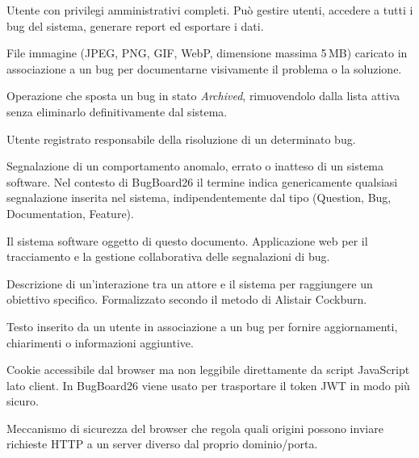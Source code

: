 ﻿\documentclass[a4paper,11pt]{article}
\begin{document}
\begin{description}[style=nextline,leftmargin=3.5cm,labelwidth=3.3cm]

\item[\textbf{Admin}] Utente con privilegi amministrativi completi. Pu\`o gestire utenti, accedere a tutti i bug del sistema, generare report ed esportare i dati.

\item[\textbf{Allegato}] File immagine (JPEG, PNG, GIF, WebP, dimensione massima 5\,MB) caricato in associazione a un bug per documentarne visivamente il problema o la soluzione.

\item[\textbf{Archiviazione}] Operazione che sposta un bug in stato \emph{Archived}, rimuovendolo dalla lista attiva senza eliminarlo definitivamente dal sistema.

\item[\textbf{Assegnatario}] Utente registrato responsabile della risoluzione di un determinato bug.

\item[\textbf{Bug}] Segnalazione di un comportamento anomalo, errato o inatteso di un sistema software. Nel contesto di BugBoard26 il termine indica genericamente qualsiasi segnalazione inserita nel sistema, indipendentemente dal tipo (Question, Bug, Documentation, Feature).

\item[\textbf{BugBoard26}] Il sistema software oggetto di questo documento. Applicazione web per il tracciamento e la gestione collaborativa delle segnalazioni di bug.

\item[\textbf{Caso d'uso}] Descrizione di un'interazione tra un attore e il sistema per raggiungere un obiettivo specifico. Formalizzato secondo il metodo di Alistair Cockburn.

\item[\textbf{Commento}] Testo inserito da un utente in associazione a un bug per fornire aggiornamenti, chiarimenti o informazioni aggiuntive.

\item[\textbf{Cookie HttpOnly}] Cookie accessibile dal browser ma non leggibile direttamente da script JavaScript lato client. In BugBoard26 viene usato per trasportare il token JWT in modo pi\`u sicuro.

\item[\textbf{CORS (Cross-Origin Resource Sharing)}] Meccanismo di sicurezza del browser che regola quali origini possono inviare richieste HTTP a un server diverso dal proprio dominio/porta.


\end{description}
\end{document}
